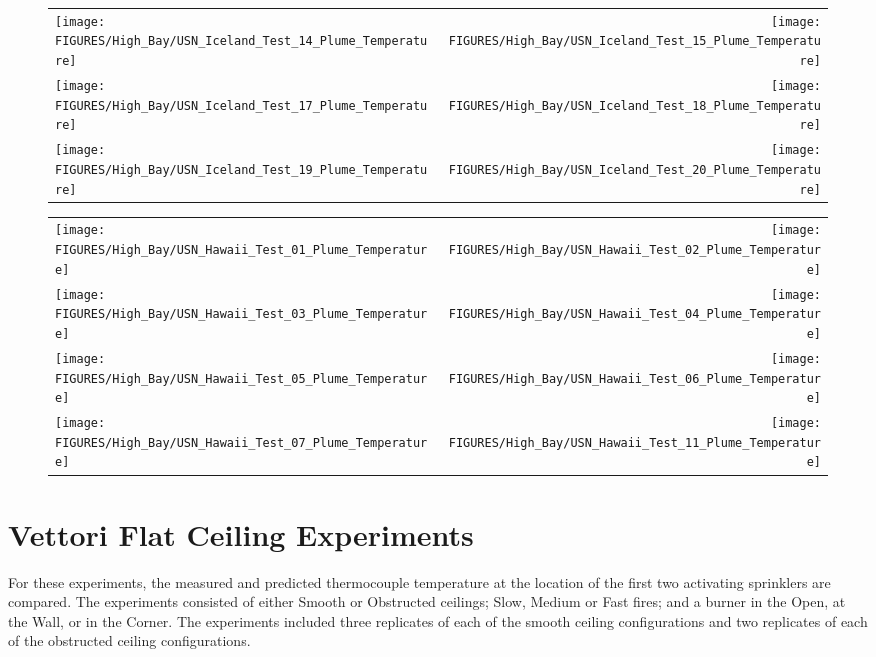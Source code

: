 \begin{figure}[p]
\begin{tabular*}{\textwidth}{l@{\extracolsep{\fill}}r}
\texttt{[image: FIGURES/High\_Bay/USN\_Iceland\_Test\_14\_Plume\_Temperature]} &
\texttt{[image: FIGURES/High\_Bay/USN\_Iceland\_Test\_15\_Plume\_Temperature]} \\
\texttt{[image: FIGURES/High\_Bay/USN\_Iceland\_Test\_17\_Plume\_Temperature]} &
\texttt{[image: FIGURES/High\_Bay/USN\_Iceland\_Test\_18\_Plume\_Temperature]} \\
\texttt{[image: FIGURES/High\_Bay/USN\_Iceland\_Test\_19\_Plume\_Temperature]} &
\texttt{[image: FIGURES/High\_Bay/USN\_Iceland\_Test\_20\_Plume\_Temperature]} \\
\end{tabular*}
\label{USN_Plume_Iceland_3}
\end{figure}

\begin{figure}[p]
\begin{tabular*}{\textwidth}{l@{\extracolsep{\fill}}r}
\texttt{[image: FIGURES/High\_Bay/USN\_Hawaii\_Test\_01\_Plume\_Temperature]} &
\texttt{[image: FIGURES/High\_Bay/USN\_Hawaii\_Test\_02\_Plume\_Temperature]} \\
\texttt{[image: FIGURES/High\_Bay/USN\_Hawaii\_Test\_03\_Plume\_Temperature]} &
\texttt{[image: FIGURES/High\_Bay/USN\_Hawaii\_Test\_04\_Plume\_Temperature]} \\
\texttt{[image: FIGURES/High\_Bay/USN\_Hawaii\_Test\_05\_Plume\_Temperature]} &
\texttt{[image: FIGURES/High\_Bay/USN\_Hawaii\_Test\_06\_Plume\_Temperature]} \\
\texttt{[image: FIGURES/High\_Bay/USN\_Hawaii\_Test\_07\_Plume\_Temperature]} &
\texttt{[image: FIGURES/High\_Bay/USN\_Hawaii\_Test\_11\_Plume\_Temperature]}
\end{tabular*}
\label{USN_Plume_Hawaii}
\end{figure}

\clearpage

\section{Vettori Flat Ceiling Experiments}
\label{Vettori_Flat_Results}

For these experiments, the measured and predicted thermocouple temperature at the location of the first two activating sprinklers are compared. The experiments consisted of either Smooth or Obstructed ceilings; Slow, Medium or Fast fires; and a burner in the Open, at the Wall, or in the Corner. The experiments included three replicates of each of the smooth ceiling configurations and two replicates of each of the obstructed ceiling configurations.


